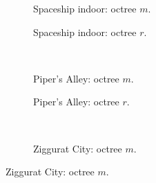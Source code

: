 \begin{figure}[p]
  \begin{adjustbox}{minipage=\textwidth, scale=0.6}
    \begin{subfigure}[b]{0.7\textwidth}
      \centering
      \def\svgwidth{\textwidth}
      
      \caption{Spaceship indoor: octree $m$.}
      \label{fig:hs-nodesize-memory::si-om}
    \end{subfigure}
  \end{adjustbox} %
  \begin{adjustbox}{minipage=\textwidth, scale=0.6}
    \begin{subfigure}[b]{0.7\textwidth}
      \centering
      \def\svgwidth{\textwidth}
      
      \caption{Spaceship indoor: octree $r$.}
      \label{fig:hs-nodesize-memory::si-or}
    \end{subfigure}
  \end{adjustbox} \\
  \begin{adjustbox}{minipage=\textwidth, scale=0.6}
    \begin{subfigure}[b]{0.7\textwidth}
      \centering
      \def\svgwidth{\textwidth}
      
      \caption{Piper's Alley: octree $m$.}
      \label{fig:hs-nodesize-memory::pa-om}
    \end{subfigure}
  \end{adjustbox} %
  \begin{adjustbox}{minipage=\textwidth, scale=0.6}
    \begin{subfigure}[b]{0.7\textwidth}
      \centering
      \def\svgwidth{\textwidth}
      
      \caption{Piper's Alley: octree $r$.}
      \label{fig:hs-nodesize-memory::pa-or}
    \end{subfigure}
  \end{adjustbox} \\
  \begin{adjustbox}{minipage=\textwidth, scale=0.6}
    \begin{subfigure}[b]{0.7\textwidth}
      \centering
      \def\svgwidth{\textwidth}
      
      \caption{Ziggurat City: octree $m$.}
      \label{fig:hs-nodesize-memory::zc-om}

\end{subfigure}
\end{adjustbox}
\end{figure}
